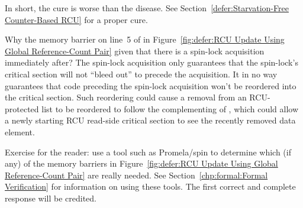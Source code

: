 	In short, the cure is worse than the disease.
	See Section~\ref{defer:Starvation-Free Counter-Based RCU}
	for a proper cure.

\QuickQ{}
	Why the memory barrier on line~5 of  in
	Figure~\ref{fig:defer:RCU Update Using Global Reference-Count Pair}
	given that there is a spin-lock acquisition immediately after?
\QuickA{}
	The spin-lock acquisition only guarantees that the spin-lock's
	critical section will not ``bleed out'' to precede the
	acquisition.
	It in no way guarantees that code preceding the spin-lock
	acquisition won't be reordered into the critical section.
	Such reordering could cause a removal from an RCU-protected
	list to be reordered to follow the complementing of
	, which could allow a newly starting RCU
	read-side critical section to see the recently removed
	data element.

	Exercise for the reader: use a tool such as Promela/spin
	to determine which (if any) of the memory barriers in
	Figure~\ref{fig:defer:RCU Update Using Global Reference-Count Pair}
	are really needed.
	See Section~\ref{chp:formal:Formal Verification}
	for information on using these tools.
	The first correct and complete response will be credited.

